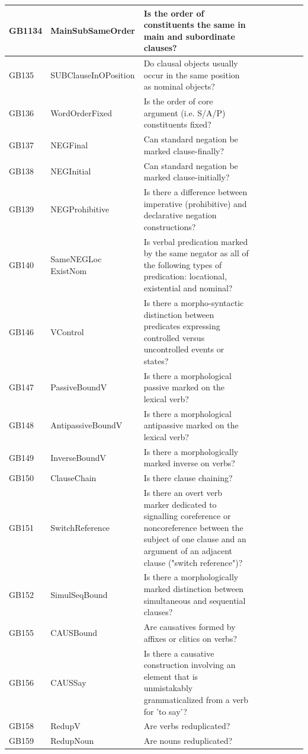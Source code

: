 \documentclass[draft,10pt]{article} %
\begin{document}
\begin{landscape}
\begin{longtable}{| l | p{4cm}| p{12cm}|p{2cm}|p{2cm}|p{2cm}|p{2cm}|p{2cm}|p{2cm}|}
GB1134 & MainSubSameOrder&Is the order of constituents the same in main and subordinate clauses?\\ \hline
GB135 & SUBClauseInOPosition&Do clausal objects usually occur in the same position as nominal objects?\\ \hline
GB136 & WordOrderFixed&Is the order of core argument (i.e. S/A/P) constituents fixed?\\ \hline
GB137 & NEGFinal&Can standard negation be marked clause-finally?\\ \hline
GB138 & NEGInitial&Can standard negation be marked clause-initially?\\ \hline
GB139 & NEGProhibitive&Is there a difference between imperative (prohibitive) and declarative negation constructions?\\ \hline
GB140 & SameNEGLoc ExistNom&Is verbal predication marked by the same negator as all of the following types of predication: locational, existential and nominal?\\ \hline
GB146 & VControl&Is there a morpho-syntactic distinction between predicates expressing controlled versus uncontrolled events or states?\\ \hline
GB147 & PassiveBoundV&Is there a morphological passive marked on the lexical verb?\\ \hline
GB148 & AntipassiveBoundV&Is there a morphological antipassive marked on the lexical verb?\\ \hline
GB149 & InverseBoundV&Is there a morphologically marked inverse on verbs?\\ \hline
GB150 & ClauseChain&Is there clause chaining?\\ \hline
GB151 & SwitchReference&Is there an overt verb marker dedicated to signalling coreference or noncoreference between the subject of one clause and an argument of an adjacent clause ("switch reference")?\\ \hline
GB152 & SimulSeqBound&Is there a morphologically marked distinction between simultaneous and sequential clauses?\\ \hline
GB155 & CAUSBound&Are causatives formed by affixes or clitics on verbs?\\ \hline
GB156 & CAUSSay&Is there a causative construction involving an element that is unmistakably grammaticalized from a verb for 'to say'?\\ \hline
GB158 & RedupV&Are verbs reduplicated?\\ \hline
GB159 & RedupNoun&Are nouns reduplicated?\\ \hline

\end{longtable}
\end{landscape}
\end{document}
